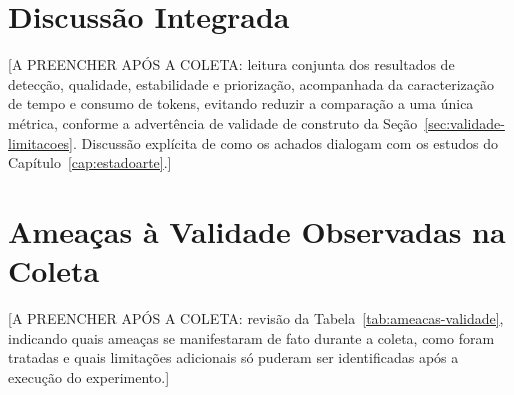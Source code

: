 \section{Discussão Integrada}\label{sec:discussao-integrada}

[A PREENCHER APÓS A COLETA: leitura conjunta dos resultados de detecção, qualidade, estabilidade e priorização, acompanhada da caracterização de tempo e consumo de tokens, evitando reduzir a comparação a uma única métrica, conforme a advertência de validade de construto da Seção~\ref{sec:validade-limitacoes}. Discussão explícita de como os achados dialogam com os estudos do Capítulo~\ref{cap:estadoarte}.]

\section{Ameaças à Validade Observadas na Coleta}\label{sec:ameacas-validade-observadas}

[A PREENCHER APÓS A COLETA: revisão da Tabela~\ref{tab:ameacas-validade}, indicando quais ameaças se manifestaram de fato durante a coleta, como foram tratadas e quais limitações adicionais só puderam ser identificadas após a execução do experimento.]
